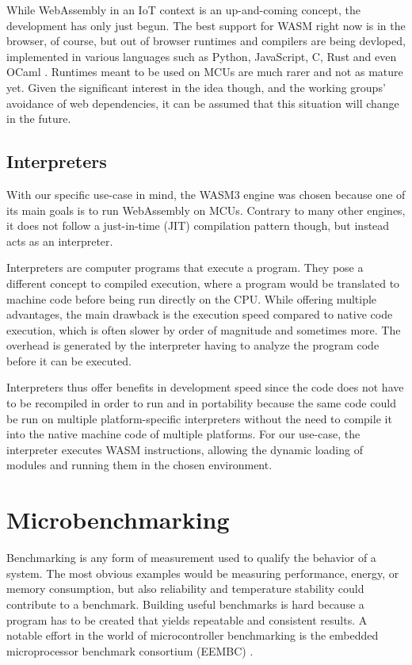 While WebAssembly in an IoT context is an up-and-coming concept, the development has only just begun. The best support for WASM right now is in the browser, of course, but out of browser runtimes and compilers are being devloped, implemented in various languages such as Python, JavaScript, C, Rust and even OCaml \autocite{akinyemi_appcypherawesome-wasm-runtimes_2020}. Runtimes meant to be used on MCUs are much rarer and not as mature yet. Given the significant interest in the idea though, and the working groups' avoidance of web dependencies, it can be assumed that this situation will change in the future.

\subsection{Interpreters}

With our specific use-case in mind, the WASM3 \autocite{noauthor_wasm3wasm3_2020} engine was chosen because one of its main goals is to run WebAssembly on MCUs. Contrary to many other engines, it does not follow a just-in-time (JIT) compilation pattern though, but instead acts as an interpreter.

Interpreters are computer programs that execute a program. They pose a different concept to compiled execution, where a program would be translated to machine code before being run directly on the CPU. While offering multiple advantages, the main drawback is the execution speed compared to native code execution, which is often slower by order of magnitude and sometimes more. The overhead is generated by the interpreter having to analyze the program code before it can be executed.

Interpreters thus offer benefits in development speed since the code does not have to be recompiled in order to run and in portability because the same code could be run on multiple platform-specific interpreters without the need to compile it into the native machine code of multiple platforms. For our use-case, the interpreter executes WASM instructions, allowing the dynamic loading of modules and running them in the chosen environment.

\section{Microbenchmarking}

Benchmarking is any form of measurement used to qualify the behavior of a system. The most obvious examples would be measuring performance, energy, or memory consumption, but also reliability and temperature stability could contribute to a benchmark. Building useful benchmarks is hard because a program has to be created that yields repeatable and consistent results. A notable effort in the world of microcontroller benchmarking is the embedded microprocessor benchmark consortium (EEMBC) \autocite{noauthor_embedded_nodate}.

